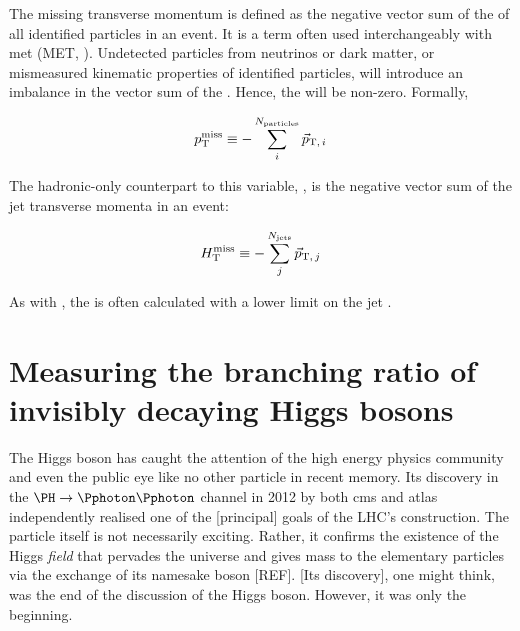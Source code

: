 The missing transverse momentum \ptmiss is defined as the negative vector sum of the \pt of all identified particles in an event. It is a term often used interchangeably with \gls{met} (MET, ). Undetected particles from neutrinos or dark matter, or mismeasured kinematic properties of identified particles, will introduce an imbalance in the vector sum of the \pt. Hence, the \ptmiss will be non-zero. Formally,

\begin{equation}
    p_{\mathrm{T}}^\text{miss} \equiv - \sum_i^{N_{\mathrm{particles}}} {\vec p}_{\mathrm{T}, \, i}
    \label{eq:met_definition}
\end{equation}

The hadronic-only counterpart to this variable, \mht, is the negative vector sum of the jet transverse momenta in an event:

\begin{equation}
    H_{\mathrm{T}}^{\text{miss}} \equiv - \sum_j^{N_{\mathrm{jets}}} {\vec p}_{\mathrm{T}, \, j}
    \label{eq:mht_definition}
\end{equation}

As with \HT, the \mht is often calculated with a lower limit on the jet \pt.





\section{Measuring the branching ratio of invisibly decaying Higgs bosons}
\label{sec:theory_higgs_to_inv}

The Higgs boson has caught the attention of the high energy physics community and even the public eye like no other particle in recent memory. Its discovery in the $\PH \rightarrow \Pphoton\Pphoton$ channel in 2012 by both \acrshort{cms} \cite{Chatrchyan:2012xdj} and \acrshort{atlas} \cite{Aad:2012tfa} independently realised one of the [principal] goals of the LHC's construction. The particle itself is not necessarily exciting. Rather, it confirms the existence of the Higgs \emph{field} that pervades the universe and gives mass to the elementary particles via the exchange of its namesake boson [REF]. [Its discovery], one might think, was the end of the discussion of the Higgs boson. However, it was only the beginning.

